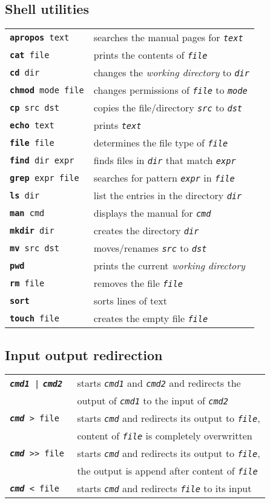 \documentclass[landscape, a4paper]{article}
\newcommand{\cv}[1]{\textit{\texttt{#1}}}
\newcommand{\shcmd}[2]{\texttt{\textbf{#1} #2}}
\begin{document}
\begin{multicols*}{3}
\subsection*{Shell utilities}
\begin{tabular}{ll}
\shcmd{apropos}{text} 			& searches the manual pages for \cv{text}\\
\shcmd{cat}{file} 				& prints the contents of \cv{file}\\
\shcmd{cd}{dir} 				& changes the \textit{working directory} to \cv{dir}\\
\shcmd{chmod}{mode file} 	    & changes permissions of \cv{file} to \cv{mode}\\
\shcmd{cp}{src dst} 		    & copies the file/directory \cv{src} to \cv{dst}\\
\shcmd{echo}{text} 			    & prints \cv{text}\\
\shcmd{file}{file} 			    & determines the file type of \cv{file}\\
\shcmd{find}{dir expr} 	        & finds files in \cv{dir} that match \cv{expr}\\
\shcmd{grep}{expr file} 	    & searches for pattern \cv{expr} in \cv{file}\\
\shcmd{ls}{dir} 				& list the entries in the directory \cv{dir}\\
\shcmd{man}{cmd} 				& displays the manual for \cv{cmd}\\
\shcmd{mkdir}{dir} 			    & creates the directory \cv{dir}\\
\shcmd{mv}{src dst} 		    & moves/renames \cv{src} to \cv{dst}\\
\shcmd{pwd}{} 					& prints the current \textit{working directory}\\
\shcmd{rm}{file} 				& removes the file \cv{file}\\
\shcmd{sort}{} 					& sorts lines of text\\
\shcmd{touch}{file} 			& creates the empty file \cv{file}
\end{tabular}
\subsection*{Input output redirection}
\begin{tabular}{ll}
\shcmd{\cv{cmd1}}{|} \shcmd{\cv{cmd2}}{} 	& starts \cv{cmd1} and \cv{cmd2} and redirects the\\
		        			  				& output of \cv{cmd1} to the input of \cv{cmd2}\\
\shcmd{\cv{cmd}}{> file} 	    			& starts \cv{cmd} and redirects its output to \cv{file},\\
	        		       					& content of \cv{file} is completely overwritten\\
\shcmd{\cv{cmd}}{>\null> file} 				& starts \cv{cmd} and redirects its output to \cv{file},\\
        			    					& the output is append after content of \cv{file}\\
\shcmd{\cv{cmd}}{< file}	    			& starts \cv{cmd} and redirects \cv{file} to its input
					  

\end{tabular}
\end{multicols*}
\end{document}
